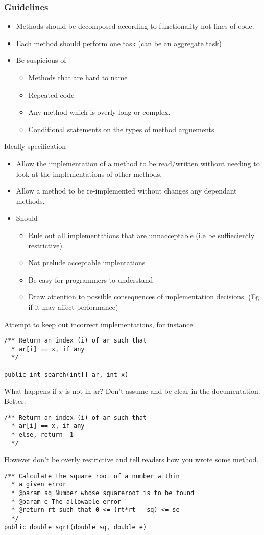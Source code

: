 \documentclass{article}
\theoremstyle{remark}
\theoremstyle{definition}
\begin{document}
\subsubsection*{Guidelines}
\begin{itemize}
  \item Methods should be decomposed according to functionality not lines of
    code.
  \item Each method should perform one task (can be an aggregate task)
  \item Be suspicious of
    \begin{itemize}
      \item Methods that are hard to name
      \item Repeated code
      \item Any method which is overly long or complex.
      \item Conditional statements on the types of method arguements
    \end{itemize}
\end{itemize}
Ideally specification
\begin{itemize}
\item Allow the implementation of a method to be read/written without
needing to look at the implementations of other methods.
\item Allow a method to be re-implemented without changes any dependant
methods.
\item Should \begin{itemize}
\item Rule out all implementations that are unnacceptable (i.e be
suffieciently restrictive).
\item Not prelude acceptable implentations
\item Be easy for programmers to understand
\item Draw attention to possible consequences of implementation decisions.
(Eg if it may affect performance)
\end{itemize}
\end{itemize}
Attempt to keep out incorrect implementations, for instance
\begin{lstlisting}
/** Return an index (i) of ar such that
  * ar[i] == x, if any
  */

public int search(int[] ar, int x)
\end{lstlisting}
What happens if $ x $ is not in ar? Don't assume and be clear in the
documentation.\\
Better:
\begin{lstlisting}
/** Return an index (i) of ar such that 
  * ar[i] == x, if any
  * else, return -1
  */
\end{lstlisting}
However don't be overly restrictive and tell readers how you wrote some method.
\begin{lstlisting}
/** Calculate the square root of a number within
  * a given error
  * @param sq Number whose squareroot is to be found
  * @param e The allowable error
  * @return rt such that 0 <= (rt*rt - sq) <= se
  */
public double sqrt(double sq, double e)
\end{lstlisting}
\end{document}
